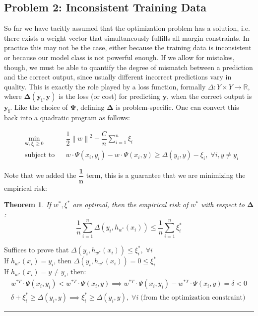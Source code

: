 \documentclass[twoside]{article}
\newcommand{\norm}[1]{\left\lVert #1 \right\rVert}
\newcounter{lecnum}
\newtheorem{theorem}{Theorem}[lecnum]
\newenvironment{proof}{{\bf Proof:}}{\hfill\rule{2mm}{2mm}}
\begin{document}
\subsection{Problem 2: Inconsistent Training Data}
So far we have tacitly assumed that the optimization problem has a solution, i.e. there exists a weight vector
that simultaneously fulfills all margin constraints. In practice this may not be the case, either because the training
data is inconsistent or because our model class is not powerful enough. If we allow for mistakes, though, we must
be able to quantify the degree of mismatch between a prediction and the correct output, since usually different incorrect predictions vary in quality. This is exactly the role
played by a loss function, formally $ \Delta : Y \times Y \rightarrow \mathbb{R}$, where
$\mathbf{\Delta(y_{i},y)}$ is the loss (or cost) for predicting $\mathbf{y}$, when the correct output is $\mathbf{y_{i}}$. Like the choice of $\mathbf{\Psi}$, defining $\mathbf{\Delta}$
is problem-specific. One can convert this back into a
quadratic program as follows:

\begin{equation*}
\begin{aligned}
& \underset{\textbf{w}, \xi_{i} \geq 0}{\text{min}}
& & \dfrac{1}{2} \norm{w}^2 + \dfrac{C}{n} \sum_{i=1}^{n} \xi_{i} \\
& \text{subject to}
& & w \cdot \Psi(x_{i},y_{i}) - w \cdot \Psi(x_{i},y) \geq  \Delta(y_{i},y) - \xi_{i} , \;\forall i, y \not = y_{i}
\end{aligned}
\end{equation*}

Note that we added the $\mathbf{\dfrac{1}{n}}$ term, this is a guarantee that we are minimizing the empirical risk:

\begin{theorem}
If $w^*,\xi^*$ are optimal, then the empirical risk of $w^*$ with respect to $\mathbf{\Delta}$:
\begin{equation*}
    \dfrac{1}{n} \sum_{i=1}^{n}\Delta(y_{i},h_{w^*}(x_{i})) \leq \dfrac{1}{n} \sum_{i=1}^{n} \xi_{i}^*
\end{equation*}
\end{theorem}
\begin{proof}
Suffices to prove that  $\Delta(y_{i},h_{w^*}(x_{i})) \leq \xi_{i}^*,  \; \forall i$ \\

If $h_{w^*}(x_{i}) = y_{i}$, then $\Delta(y_{i},h_{w^*}(x_{i})) = 0 \leq \xi_{i}^*$ \\

If $h_{w^*}(x_{i}) = y \not = y_{i}$, then:
\begin{align*}
       w^{*T}\cdot \Psi(x_{i},y_{i}) < w^{*T} \cdot \Psi(x_{i},y) \implies w^{*T}\cdot \Psi(x_{i},y_{i}) - w^{*T} \cdot \Psi(x_{i},y) = \delta < 0\\      \delta + \xi_{i}^* \geq \Delta(y_{i},y)  \implies  \xi_{i}^* \geq \Delta(y_{i},y)  , \;\forall i \; \text{(from the optimization constraint)}
\end{align*}
\end{proof}
\end{document}

